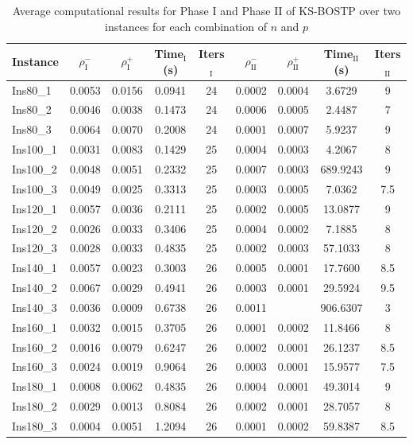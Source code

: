 \begin{table}[ht!]
\centering
\caption{Average computational results for Phase I and Phase II of KS-BOSTP over two instances for each combination of $n$ and $p$}
\setlength{\tabcolsep}{5pt}
\begin{tabular}{lcccccccc}
\toprule
Instance & $\rho^{-}_{\mathrm{I}}$ & $\rho^{+}_{\mathrm{I}}$ & Time$_{\mathrm{I}}$ (s) & Iters$_{\mathrm{I}}$ & $\rho^{-}_{\mathrm{II}}$ & $\rho^{+}_{\mathrm{II}}$ & Time$_{\mathrm{II}}$ (s) & Iters$_{\mathrm{II}}$ \\
\midrule
Ins80\_1  & 0.0053 & 0.0156 & 0.0941 & 24 & 0.0002 & 0.0004 & 3.6729 & 9 \\
Ins80\_2  & 0.0046 & 0.0038 & 0.1473 & 24 & 0.0006 & 0.0005 & 2.4487 & 7 \\
Ins80\_3  & 0.0064 & 0.0070 & 0.2008 & 24 & 0.0001 & 0.0007 & 5.9237 & 9 \\
Ins100\_1 & 0.0031 & 0.0083 & 0.1429 & 25 & 0.0004 & 0.0003 & 4.2067 & 8 \\
Ins100\_2 & 0.0048 & 0.0051 & 0.2332 & 25 & 0.0007 & 0.0003 & 689.9243 & 9 \\
Ins100\_3 & 0.0049 & 0.0025 & 0.3313 & 25 & 0.0003 & 0.0005 & 7.0362 & 7.5 \\
Ins120\_1 & 0.0057 & 0.0036 & 0.2111 & 25 & 0.0002 & 0.0005 & 13.0877 & 9 \\
Ins120\_2 & 0.0026 & 0.0033 & 0.3406 & 25 & 0.0004 & 0.0002 & 7.1885 & 8 \\
Ins120\_3 & 0.0028 & 0.0033 & 0.4835 & 25 & 0.0002 & 0.0003 & 57.1033 & 8 \\
Ins140\_1 & 0.0057 & 0.0023 & 0.3003 & 26 & 0.0005 & 0.0001 & 17.7600 & 8.5 \\
Ins140\_2 & 0.0067 & 0.0029 & 0.4941 & 26 & 0.0003 & 0.0001 & 29.5924 & 9.5 \\
Ins140\_3 & 0.0036 & 0.0009 & 0.6738 & 26 & 0.0011 & \text{--} & 906.6307 & 3 \\
Ins160\_1 & 0.0032 & 0.0015 & 0.3705 & 26 & 0.0001 & 0.0002 & 11.8466 & 8 \\
Ins160\_2 & 0.0016 & 0.0079 & 0.6247 & 26 & 0.0002 & 0.0001 & 26.1237 & 8.5 \\
Ins160\_3 & 0.0024 & 0.0019 & 0.9064 & 26 & 0.0003 & 0.0001 & 15.9577 & 7.5 \\
Ins180\_1 & 0.0008 & 0.0062 & 0.4835 & 26 & 0.0004 & 0.0001 & 49.3014 & 9 \\
Ins180\_2 & 0.0029 & 0.0013 & 0.8084 & 26 & 0.0002 & 0.0001 & 28.7057 & 8 \\
Ins180\_3 & 0.0004 & 0.0051 & 1.2094 & 26 & 0.0001 & 0.0002 & 59.8387 & 8.5 \\
\bottomrule
\end{tabular}
\label{tab:ks_solution_BOSTP}
\end{table}
